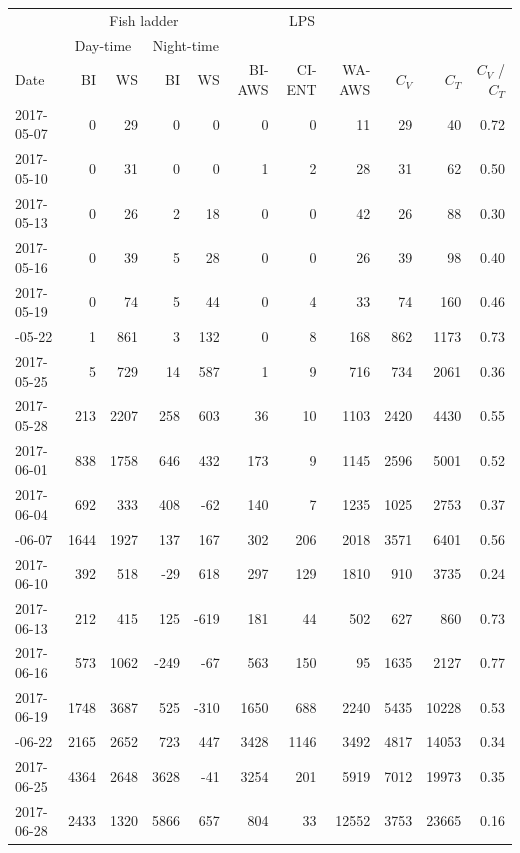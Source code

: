 \documentclass[
]{article}
\begin{document}
\begin{longtable}{lrrrrrrrrrr}
\toprule
\multicolumn{1}{c}{ } & \multicolumn{4}{c}{Fish ladder} & \multicolumn{3}{c}{LPS} & \multicolumn{3}{c}{ } \\
\cmidrule(l{3pt}r{3pt}){2-5} \cmidrule(l{3pt}r{3pt}){6-8}
\multicolumn{1}{c}{ } & \multicolumn{2}{c}{Day-time} & \multicolumn{2}{c}{Night-time} & \multicolumn{6}{c}{ } \\
\cmidrule(l{3pt}r{3pt}){2-3} \cmidrule(l{3pt}r{3pt}){4-5}
Date & BI & WS & BI & WS & BI-AWS & CI-ENT & WA-AWS & $C_V$ & $C_T$ & $C_V$ / $C_T$\\
\midrule
2017-05-07 & 0 & 29 & 0 & 0 & 0 & 0 & 11 & 29 & 40 & 0.72\\
2017-05-10 & 0 & 31 & 0 & 0 & 1 & 2 & 28 & 31 & 62 & 0.50\\
2017-05-13 & 0 & 26 & 2 & 18 & 0 & 0 & 42 & 26 & 88 & 0.30\\
2017-05-16 & 0 & 39 & 5 & 28 & 0 & 0 & 26 & 39 & 98 & 0.40\\
2017-05-19 & 0 & 74 & 5 & 44 & 0 & 4 & 33 & 74 & 160 & 0.46\\
\addlinespace
2017-05-22 & 1 & 861 & 3 & 132 & 0 & 8 & 168 & 862 & 1173 & 0.73\\
2017-05-25 & 5 & 729 & 14 & 587 & 1 & 9 & 716 & 734 & 2061 & 0.36\\
2017-05-28 & 213 & 2207 & 258 & 603 & 36 & 10 & 1103 & 2420 & 4430 & 0.55\\
2017-06-01 & 838 & 1758 & 646 & 432 & 173 & 9 & 1145 & 2596 & 5001 & 0.52\\
2017-06-04 & 692 & 333 & 408 & -62 & 140 & 7 & 1235 & 1025 & 2753 & 0.37\\
\addlinespace
2017-06-07 & 1644 & 1927 & 137 & 167 & 302 & 206 & 2018 & 3571 & 6401 & 0.56\\
2017-06-10 & 392 & 518 & -29 & 618 & 297 & 129 & 1810 & 910 & 3735 & 0.24\\
2017-06-13 & 212 & 415 & 125 & -619 & 181 & 44 & 502 & 627 & 860 & 0.73\\
2017-06-16 & 573 & 1062 & -249 & -67 & 563 & 150 & 95 & 1635 & 2127 & 0.77\\
2017-06-19 & 1748 & 3687 & 525 & -310 & 1650 & 688 & 2240 & 5435 & 10228 & 0.53\\
\addlinespace
2017-06-22 & 2165 & 2652 & 723 & 447 & 3428 & 1146 & 3492 & 4817 & 14053 & 0.34\\
2017-06-25 & 4364 & 2648 & 3628 & -41 & 3254 & 201 & 5919 & 7012 & 19973 & 0.35\\
2017-06-28 & 2433 & 1320 & 5866 & 657 & 804 & 33 & 12552 & 3753 & 23665 & 0.16\\

\end{longtable}
\end{document}
